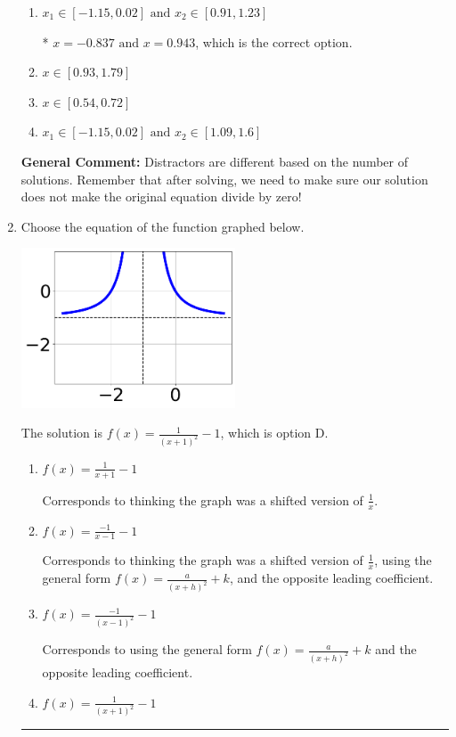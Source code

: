 \documentclass{extbook}[14pt]
\newcommand{\litem}[1]{\item #1

\rule{\textwidth}{0.4pt}}
\begin{document}
\begin{enumerate}
{\begin{enumerate}[label=\Alph*.]
\item \( x_1 \in [-1.15, 0.02] \text{ and } x_2 \in [0.91,1.23] \)

* $x = -0.837 \text{ and } x = 0.943$, which is the correct option.
\item \( x \in [0.93,1.79] \)


\item \( x \in [0.54,0.72] \)


\item \( x_1 \in [-1.15, 0.02] \text{ and } x_2 \in [1.09,1.6] \)


\end{enumerate}

\textbf{General Comment:} Distractors are different based on the number of solutions. Remember that after solving, we need to make sure our solution does not make the original equation divide by zero!
}
\litem{
Choose the equation of the function graphed below.

\begin{center}
    \includegraphics[width=0.5\textwidth]{../Figures/rationalGraphToEquationA.png}
\end{center}


The solution is \( f(x) = \frac{1}{(x + 1)^2} - 1 \), which is option D.\begin{enumerate}[label=\Alph*.]
\item \( f(x) = \frac{1}{x + 1} - 1 \)

Corresponds to thinking the graph was a shifted version of $\frac{1}{x}$.
\item \( f(x) = \frac{-1}{x - 1} - 1 \)

Corresponds to thinking the graph was a shifted version of $\frac{1}{x}$, using the general form $f(x) = \frac{a}{(x+h)^2}+k$, and the opposite leading coefficient.
\item \( f(x) = \frac{-1}{(x - 1)^2} - 1 \)

Corresponds to using the general form $f(x) = \frac{a}{(x+h)^2}+k$ and the opposite leading coefficient.
\item \( f(x) = \frac{1}{(x + 1)^2} - 1 \)


\end{enumerate}}
\end{enumerate}
\end{document}
